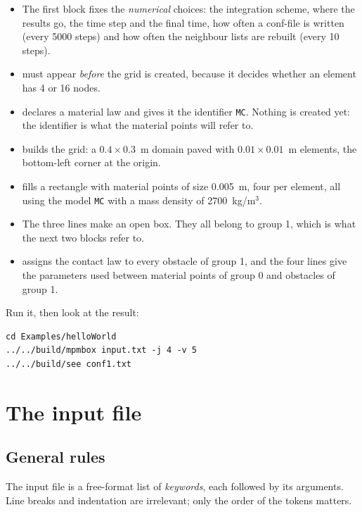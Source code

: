 \documentclass[a4paper,onecolumn,11pt]{doofus}
\begin{document}
\begin{itemize}
\item The first block fixes the \emph{numerical} choices: the integration scheme, where the
      results go, the time step and the final time, how often a conf-file is written
      (every 5000 steps) and how often the neighbour lists are rebuilt (every 10 steps).
\item {} must appear \emph{before} the grid is created, because it decides
      whether an element has 4 or 16 nodes.
\item {} declares a material law and gives it the identifier \texttt{MC}. Nothing
      is created yet: the identifier is what the material points will refer to.
\item {} builds the grid: a $0.4 \times 0.3$~m domain paved with
      $0.01 \times 0.01$~m elements, the bottom-left corner at the origin.
\item {} fills a rectangle with material points of size 0.005~m, four per
      element, all using the model \texttt{MC} with a mass density of 2700~kg/m$^3$.
\item The three  lines make an open box. They all belong to group 1, which is
      what the next two blocks refer to.
\item {} assigns the contact law to every obstacle of group 1, and the
      four  lines give the parameters used between material points of group 0 and
      obstacles of group 1.
\end{itemize}

Run it, then look at the result:

\begin{lstlisting}[style=mystyle,numbers=none]
cd Examples/helloWorld
../../build/mpmbox input.txt -j 4 -v 5
../../build/see conf1.txt
\end{lstlisting}


\section{The input file}
\label{sec:syntax}

\subsection{General rules}
\label{sec:rules}

The input file is a free-format list of \emph{keywords}, each followed by its arguments. Line
breaks and indentation are irrelevant; only the order of the tokens matters.
\end{document}
